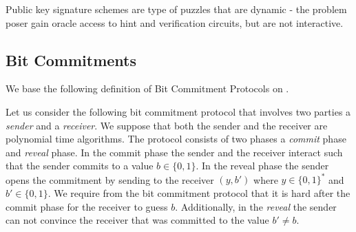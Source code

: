 \documentclass[11pt,a4paper,titlepage]{memoir}
\begin{document}
Public key signature schemes are type of puzzles that are dynamic - the problem poser gain oracle access to hint and verification circuits,
but are not interactive.

\subsection{Bit Commitments}
We base the following definition of Bit Commitment Protocols on \cite{LectureNotesComThCrypto}.

Let us consider the following bit commitment protocol that involves two parties a \textit{sender} and a \textit{receiver}.
We suppose that both the sender and the receiver are polynomial time algorithms.
The protocol consists of two phases a \textit{commit} phase and \textit{reveal} phase.
In the commit phase the sender and the receiver interact such that the sender commits to a value $b \in \{0,1\}$.
In the reveal phase the sender opens the commitment by sending to the receiver $(y,b')$ where $y \in \{0,1\}^{*}$ and $b' \in \{0,1\}$.
We require from the bit commitment protocol that it is hard after the commit phase for the receiver to guess $b$.
Additionally, in the \textit{reveal} the sender can not convince the receiver that was committed to the value $b' \neq b$.
\end{document}
